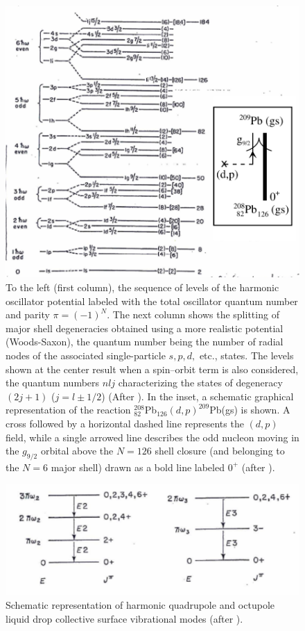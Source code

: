 \documentclass[a4paper,11pt]{book}
\numberwithin{equation}{section}
\numberwithin{figure}{section}
\numberwithin{table}{section}
\begin{document}
\begin{figure}
	\centerline {
		\includegraphics*[width=12cm]{introduccion/figs/figpreface3}
	}
	\caption{To the left (first column), the sequence of levels of the harmonic oscillator potential labeled with the total oscillator quantum number and parity $\pi=(-1)^N$. The next column shows the splitting of major shell degeneracies obtained using a more realistic potential (Woods-Saxon), the quantum number being the number of radial nodes of the associated single-particle $s,p,d,$ etc., states. The levels shown at the center result when a spin--orbit term is also considered, the quantum numbers $nlj$ characterizing the states of degeneracy $(2j+1)$ ($j=l\pm1/2$) (After \cite{Mayer:63}). In the inset, a schematic graphical representation of the reaction $^{208}_{82}$Pb$_{126}(d,p)^{209}$Pb(gs) is shown. A cross followed by a horizontal dashed line represents  the $(d,p)$ field, while a  single arrowed line describes the odd nucleon moving in the $g_{9/2}$ orbital above the $N=126$ shell closure (and belonging to the $N=6$ major shell) drawn as a bold line labeled $0^+$ (after \cite{Bohr:69}).}
	\label{fig1.0.3}
\end{figure}
\begin{figure}
	\centerline {
		\includegraphics*[width=12cm]{introduccion/figs/figpreface4}
	}
	\caption{Schematic representation of harmonic quadrupole and octupole liquid drop collective surface vibrational modes (after \cite{Rowe:70}).}
	\label{fig1.0.4}
\end{figure}
\end{document}
